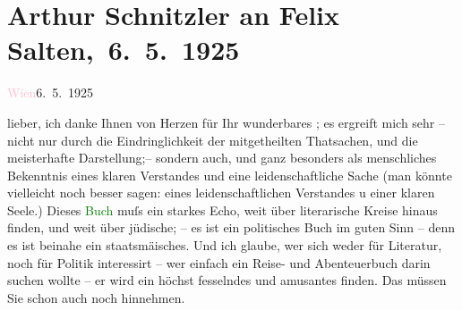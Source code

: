 

\renewcommand{\erwaehntePersonen}{Personen: Ottilie Salten, Felix Salten}
\renewcommand{\erwaehnteOrte}{Orte: Czernowitz, Palästina, Wien}
\renewcommand{\erwaehnteWerke}{Werke: Neue Menschen auf alter Erde. Eine Palästinafahrt}
\section[ Arthur Schnitzler an Felix Salten, 6. 5. 1925]{Arthur Schnitzler an Felix Salten, 6. 5. 1925}
\nopagebreak{}
\rehead{ }\normalsize\beginnumbering{}
\toendnotes[C]{\smallbreak\pagebreak[2]}
\toendnotes[C]{\smallbreak}
\pstart
           \raggedleft{}{\pb}\textcolor{pink}{Wien}{}\ledrightnote{\textcolor{pink}{Wien}}{ }6. 5. 1925\pend
           
\pstart
           lieber, ich danke Ihnen von Herzen für Ihr wunderbares \label{K_L03021-1v}\label{K_L03021-1h}; es
               ergreift mich sehr – nicht nur durch die Eindringlichkeit der mitgetheilten
               Thatsachen, und die meisterhafte Darstellung;– sondern auch, und ganz besonders als
               menschliches Bekenntnis eines klaren Verstandes und eine leidenschaftliche Sache (man
               könnte vielleicht noch besser sagen: eines leidenschaftlichen Verstandes u einer
               klaren Seele.) Dieses \textcolor{green}{Buch}{}\ledrightnote{{$\rightarrow$}\textcolor{green}{Neue Menschen auf alter Erde. Eine Palästinafahrt}}
               muſs ein starkes Echo, weit über literarische Kreise hinaus finden, und weit über
               jüdische; – es ist ein politisches Buch im guten Sinn – denn es ist beinahe ein
                  staatsmä{\geminationn}isches. Und ich glaube, wer sich weder für
               Literatur, noch {\pb}für Politik interessirt –
               wer einfach ein Reise- und Abenteuerbuch darin \strikeout{\textcolor{gray}{finden}} suchen wollte – er wird ein höchst fesselndes und amusantes \strikeout{\textcolor{gray}{darin}} finden. Das müssen Sie schon
               auch noch hinnehmen.\pend
           

